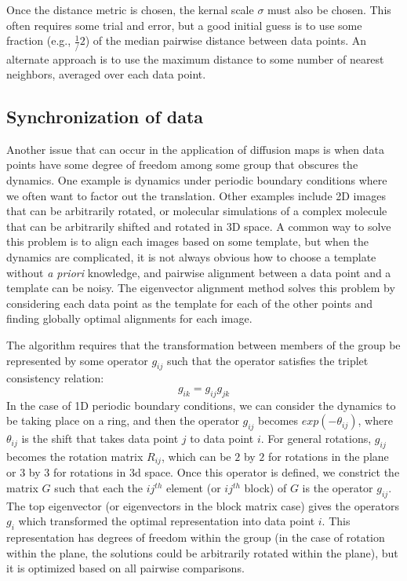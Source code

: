 \documentclass[12pt]{article}
\begin{document}
Once the distance metric is chosen, the kernal scale $\sigma$ must also be chosen. This often requires some trial and error, but a good initial guess is to use some fraction (e.g., $\frac{1}/{2}$) of the median pairwise distance between data points. An alternate approach is to use the maximum distance to some number of nearest neighbors, averaged over each data point.

\subsection{Synchronization of data}

Another issue that can occur in the application of diffusion maps is when data points have some degree of freedom among some group that obscures the dynamics. One example is dynamics under periodic boundary conditions where we often want to factor out the translation. Other examples include 2D images that can be arbitrarily rotated, or molecular simulations of a complex molecule that can be arbitrarily shifted and rotated in 3D space. A common way to solve this problem is to align each images based on some template, but when the dynamics are complicated, it is not always obvious how to choose a template without \textit{a priori} knowledge, and pairwise alignment between a data point and a template can be noisy. The eigenvector alignment method solves this problem by considering each data point as the template for each of the other points and finding globally optimal alignments for each image. \vspace{1mm}

The algorithm requires that the transformation between members of the group be represented by some operator $g_{ij}$ such that the operator satisfies the triplet consistency relation:
\[
g_{ik} = g_{ij}g_{jk}
\]
In the case of 1D periodic boundary conditions, we can consider the dynamics to be taking place on a ring, and then the operator $g_{ij}$ becomes $exp(-\theta_{ij})$, where $\theta_{ij}$ is the shift that takes data point $j$ to data point $i$. For general rotations, $g_{ij}$ becomes the rotation matrix $R_{ij}$, which can be $2$ by $2$ for rotations in the plane or $3$ by $3$ for rotations in 3d space. Once this operator is defined, we constrict the matrix $G$ such that each the $ij^{th}$ element (or $ij^{th}$  block) of $G$ is the operator $g_{ij}$. The top eigenvector (or eigenvectors in the block matrix case) gives the operators $g_i$ which transformed the optimal representation into data point $i$. This representation has degrees of freedom within the group (in the case of rotation within the plane, the solutions could be arbitrarily rotated within the plane), but it is optimized based on all pairwise comparisons. \vspace{1mm}
\end{document}

